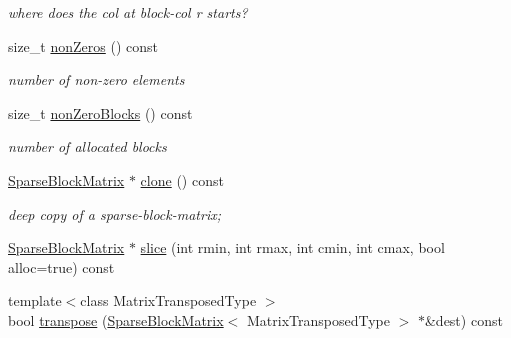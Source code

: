 \begin{DoxyCompactItemize}
\begin{DoxyCompactList}\small\item\em where does the col at block-\/col r starts? \end{DoxyCompactList}\item 
\hypertarget{classg2o_1_1SparseBlockMatrix_a52c11b08907dbb80ac44ad5459bc70fe}{size\-\_\-t \hyperlink{classg2o_1_1SparseBlockMatrix_a52c11b08907dbb80ac44ad5459bc70fe}{non\-Zeros} () const }\label{classg2o_1_1SparseBlockMatrix_a52c11b08907dbb80ac44ad5459bc70fe}

\begin{DoxyCompactList}\small\item\em number of non-\/zero elements \end{DoxyCompactList}\item 
\hypertarget{classg2o_1_1SparseBlockMatrix_a4e2ecdfdec3b47b2f9373c56aecc7d15}{size\-\_\-t \hyperlink{classg2o_1_1SparseBlockMatrix_a4e2ecdfdec3b47b2f9373c56aecc7d15}{non\-Zero\-Blocks} () const }\label{classg2o_1_1SparseBlockMatrix_a4e2ecdfdec3b47b2f9373c56aecc7d15}

\begin{DoxyCompactList}\small\item\em number of allocated blocks \end{DoxyCompactList}\item 
\hypertarget{classg2o_1_1SparseBlockMatrix_ac2946d6216dd2adfbd257b495a589d13}{\hyperlink{classg2o_1_1SparseBlockMatrix}{Sparse\-Block\-Matrix} $\ast$ \hyperlink{classg2o_1_1SparseBlockMatrix_ac2946d6216dd2adfbd257b495a589d13}{clone} () const }\label{classg2o_1_1SparseBlockMatrix_ac2946d6216dd2adfbd257b495a589d13}

\begin{DoxyCompactList}\small\item\em deep copy of a sparse-\/block-\/matrix; \end{DoxyCompactList}\item 
\hyperlink{classg2o_1_1SparseBlockMatrix}{Sparse\-Block\-Matrix} $\ast$ \hyperlink{classg2o_1_1SparseBlockMatrix_abc8836f73757f69b97965459944043a5}{slice} (int rmin, int rmax, int cmin, int cmax, bool alloc=true) const 
\item 
\hypertarget{classg2o_1_1SparseBlockMatrix_a85d0915bc613dac1a46d372fc1cacde7}{{\footnotesize template$<$class Matrix\-Transposed\-Type $>$ }\\bool \hyperlink{classg2o_1_1SparseBlockMatrix_a85d0915bc613dac1a46d372fc1cacde7}{transpose} (\hyperlink{classg2o_1_1SparseBlockMatrix}{Sparse\-Block\-Matrix}$<$ Matrix\-Transposed\-Type $>$ $\ast$\&dest) const }\label{classg2o_1_1SparseBlockMatrix_a85d0915bc613dac1a46d372fc1cacde7}


\end{DoxyCompactItemize}
